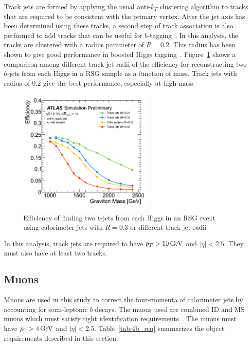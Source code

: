 Track jets are formed by applying the usual anti-$k_{T}$ clustering algorithm to tracks that are required to be consistent with the primary vertex. After the jet axis has been determined using these tracks, a second step of track association is also performed to add tracks that can be useful for $b$-tagging~\cite{TrackJets}. In this analysis, the tracks are clustered with a radius parameter of $R = 0.2$. This radius has been shown to give good performance in boosted Higgs tagging~\cite{TrackJets,BoostedHiggs}. Figure~\ref{fig:rcomp} shows a comparison among different track jet radii of the efficiency for reconstructing two $b$-jets from each Higgs in a RSG sample as a function of mass. Track jets with radius of $0.2$ give the best performance, especially at high mass. 
%
\begin{figure}[h!]
  \centering
  \captionsetup{justification=centering}

  \includegraphics[width=0.6\textwidth]{figures/TrackJet_RComp}
  \caption{Efficiency of finding two $b$-jets from each Higgs in an RSG event using calorimeter jets with $R=0.3$ or different track jet radii~\cite{TrackJets}}
  \label{fig:rcomp}
\end{figure}
%
In this analysis, track jets are required to have $p_{T} > 10 \GeV$ and $|\eta| < 2.5$. They must also have at least two tracks. 

\subsection{Muons}

Muons are used in this study to correct the four-momenta of calorimeter jets by accounting for semi-leptonic $b$ decays. The muons used are combined ID and MS muons which must satisfy tight identification requirements~\cite{MuonReco}. The muons must have $\pT > 4 \GeV$ and $|\eta| < 2.5$. Table~\ref{tab:4b_req} summarizes the object requirements described in this section.


